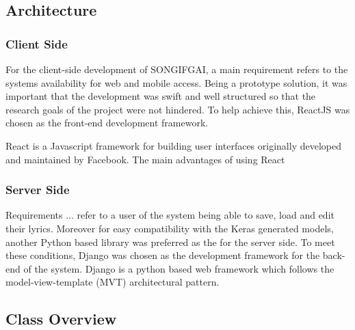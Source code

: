 \subsection{Architecture}
\subsubsection{Client Side}
For the client-side development of SONGIFGAI, a main requirement refers to the systems availability for web and mobile access. Being a prototype solution, it was important that the development was swift and well structured so that the research goals of the project were not hindered. To help achieve this, ReactJS was chosen as the front-end development framework.

\noindent
\newline
React is a Javascript framework for building user interfaces originally developed and maintained by Facebook. The main advantages of using React
\subsubsection{Server Side}
Requirements ... refer to a user of the system being able to save, load and edit their lyrics. Moreover for easy compatibility with the Keras generated models, another Python based library was preferred as the for the server side. To meet these conditions, Django was chosen as the development framework for the back-end of the system. Django is a python based web framework which follows the model-view-template (MVT) architectural pattern.
\subsection{Class Overview}